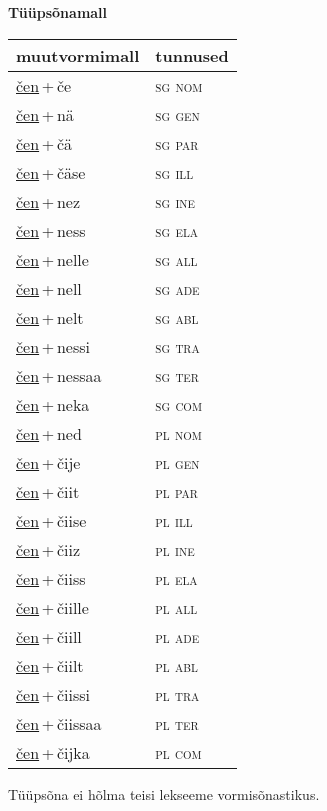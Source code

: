 
\vspace{1.8em}
\begin{minipage}{\textwidth}
\textbf{Tüüpsõnamall \,}\\

\begin{sideways}
\begin{tabular}{l l}
muutvormimall & tunnused \\
\hline
\underline{čen}\,+\,če & \textsc{ sg nom } \\
\underline{čen}\,+\,nä & \textsc{ sg gen } \\
\underline{čen}\,+\,čä & \textsc{ sg par } \\
\underline{čen}\,+\,čäse & \textsc{ sg ill } \\
\underline{čen}\,+\,nez & \textsc{ sg ine } \\
\underline{čen}\,+\,ness & \textsc{ sg ela } \\
\underline{čen}\,+\,nelle & \textsc{ sg all } \\
\underline{čen}\,+\,nell & \textsc{ sg ade } \\
\underline{čen}\,+\,nelt & \textsc{ sg abl } \\
\underline{čen}\,+\,nessi & \textsc{ sg tra } \\
\underline{čen}\,+\,nessaa & \textsc{ sg ter } \\
\underline{čen}\,+\,neka & \textsc{ sg com } \\
\underline{čen}\,+\,ned & \textsc{ pl nom } \\
\underline{čen}\,+\,čije & \textsc{ pl gen } \\
\underline{čen}\,+\,čiit & \textsc{ pl par } \\
\underline{čen}\,+\,čiise & \textsc{ pl ill } \\
\underline{čen}\,+\,čiiz & \textsc{ pl ine } \\
\underline{čen}\,+\,čiiss & \textsc{ pl ela } \\
\underline{čen}\,+\,čiille & \textsc{ pl all } \\
\underline{čen}\,+\,čiill & \textsc{ pl ade } \\
\underline{čen}\,+\,čiilt & \textsc{ pl abl } \\
\underline{čen}\,+\,čiissi & \textsc{ pl tra } \\
\underline{čen}\,+\,čiissaa & \textsc{ pl ter } \\
\underline{čen}\,+\,čijka & \textsc{ pl com } \\
\end{tabular}
\end{sideways}
\label{tab:tüüpsõnamall-čenče}

\end{minipage}

 
\vspace{1em}
\noindent Tüüpsõna ei hõlma teisi lekseeme vormi\-sõnastikus.
